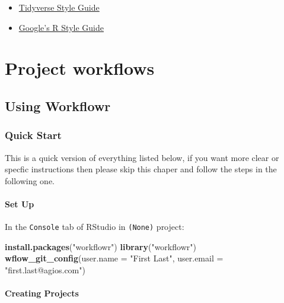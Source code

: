 \documentclass[]{book}
\newenvironment{Shaded}{\begin{snugshade}}{\end{snugshade}}
\newcommand{\DataTypeTok}[1]{\textcolor[rgb]{0.13,0.29,0.53}{#1}}
\newcommand{\KeywordTok}[1]{\textcolor[rgb]{0.13,0.29,0.53}{\textbf{#1}}}
\newcommand{\NormalTok}[1]{#1}
\newcommand{\StringTok}[1]{\textcolor[rgb]{0.31,0.60,0.02}{#1}}
\providecommand{\tightlist}{%
  \setlength{\itemsep}{0pt}\setlength{\parskip}{0pt}}
\begin{document}
\begin{itemize}
\tightlist
\item
  \href{https://style.tidyverse.org}{Tidyverse Style Guide}
\item
  \href{https://google.github.io/styleguide/Rguide.xml}{Google's R Style Guide}
\end{itemize}

\hypertarget{workflows}{%
\chapter{Project workflows}\label{workflows}}

\hypertarget{using-workflowr}{%
\section{Using Workflowr}\label{using-workflowr}}

\hypertarget{quick-start}{%
\subsection{Quick Start}\label{quick-start}}

This is a quick version of everything listed below, if you want more clear or specfic instructions then please skip this chaper and follow the steps in the following one.

\hypertarget{set-up}{%
\subsubsection{Set Up}\label{set-up}}

In the \texttt{Console} tab of RStudio in \texttt{(None)} project:

\begin{Shaded}
\begin{Highlighting}[]
\KeywordTok{install.packages}\NormalTok{(}\StringTok{"workflowr"}\NormalTok{)}
\KeywordTok{library}\NormalTok{(}\StringTok{"workflowr"}\NormalTok{)}
\KeywordTok{wflow_git_config}\NormalTok{(}\DataTypeTok{user.name =} \StringTok{"First Last"}\NormalTok{, }\DataTypeTok{user.email =} \StringTok{"first.last@agios.com"}\NormalTok{)}
\end{Highlighting}
\end{Shaded}

\hypertarget{creating-projects}{%
\subsubsection{Creating Projects}\label{creating-projects}}
\end{document}
